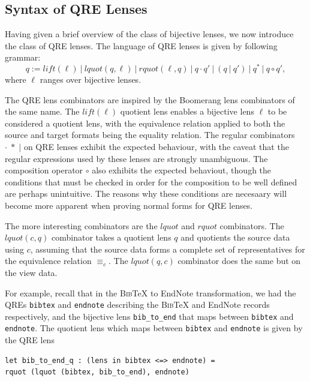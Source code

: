 \documentclass{svproc}
\newcommand{\cd}[1]{\lstinline[backgroundcolor=\color{white}]$#1$}
\newcommand{\sep}{\ensuremath{\ | \ }}
\newcommand{\bibtex}{\textsc{Bib}\TeX{}}
\newcommand{\eqrel}[1]{\ensuremath{\equiv_{#1}}}
\begin{document}
\subsection{Syntax of QRE Lenses}
Having given a brief overview of the class of bijective lenses, we now introduce
the class of QRE lenses. The language of QRE lenses is given by following
grammar:
$$ q := \mathit{lift}(\ell) \sep \mathit{lquot}(q, \ell) \sep
\mathit{rquot}(\ell, q) \sep q \cdot q' \sep (q \sep q') \sep q^* \sep q \circ q',$$
where $\ell$ ranges over bijective lenses.

The QRE lens combinators are inspired by the Boomerang lens combinators of the
same name. The $\mathit{lift}(\ell)$ quotient lens enables a bijective lens
$\ell$ to be considered a quotient lens, with the equivalence relation applied
to both the source and target formats being the equality relation. The
regular combinators $\cdot \; * \; |$ on QRE lenses exhibit the expected
behaviour, with the caveat that the regular expressions used by these lenses
are strongly unambiguous. The composition operator $\circ$ also exhibits the
expected behaviout, though the conditions that must be checked in order for the
composition to be well defined are perhaps unintuitive. The reasons why
these conditions are necesaary will become more apparent when proving normal
forms for QRE lenses.

The more interesting combinators are the $\mathit{lquot}$ and $\mathit{rquot}$
combinators. The $\mathit{lquot}(c, q)$ combinator takes a quotient lens $q$ and
quotients the source data using $c$, assuming that the source data forms a
complete set of representatives for the equivalence relation $\eqrel{c}$. The
$\mathit{lquot}(q, c)$ combinator does the same but on the view data. 

For example, recall that in the \bibtex{} to EndNote transformation, we had the
QREs \cd{bibtex} and \cd{endnote} describing the \bibtex{} and EndNote records
respectively, and the bijective lens \cd{bib_to_end} that maps between
\cd{bibtex} and \cd{endnote}. The quotient lens which maps between
\cd{bibtex} and \cd{endnote} is given by the QRE lens

\begin{lstlisting}
let bib_to_end_q : (lens in bibtex <=> endnote) = 
rquot (lquot (bibtex, bib_to_end), endnote)
 \end{lstlisting} 
\end{document}
